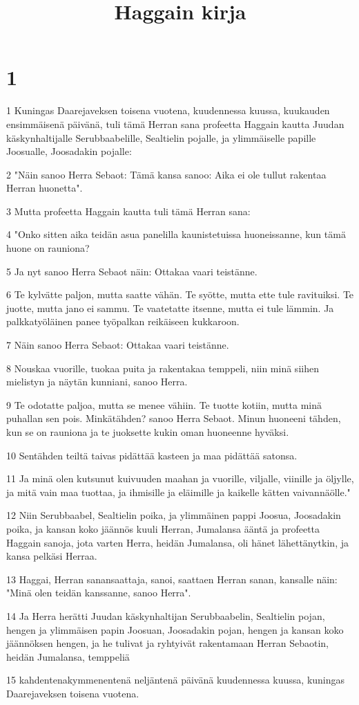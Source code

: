 

\title{Haggain kirja}


\chapter{1}

\par 1 Kuningas Daarejaveksen toisena vuotena, kuudennessa kuussa, kuukauden ensimmäisenä päivänä, tuli tämä Herran sana profeetta Haggain kautta Juudan käskynhaltijalle Serubbaabelille, Sealtielin pojalle, ja ylimmäiselle papille Joosualle, Joosadakin pojalle:
\par 2 "Näin sanoo Herra Sebaot: Tämä kansa sanoo: Aika ei ole tullut rakentaa Herran huonetta".
\par 3 Mutta profeetta Haggain kautta tuli tämä Herran sana:
\par 4 "Onko sitten aika teidän asua panelilla kaunistetuissa huoneissanne, kun tämä huone on rauniona?
\par 5 Ja nyt sanoo Herra Sebaot näin: Ottakaa vaari teistänne.
\par 6 Te kylvätte paljon, mutta saatte vähän. Te syötte, mutta ette tule ravituiksi. Te juotte, mutta jano ei sammu. Te vaatetatte itsenne, mutta ei tule lämmin. Ja palkkatyöläinen panee työpalkan reikäiseen kukkaroon.
\par 7 Näin sanoo Herra Sebaot: Ottakaa vaari teistänne.
\par 8 Nouskaa vuorille, tuokaa puita ja rakentakaa temppeli, niin minä siihen mielistyn ja näytän kunniani, sanoo Herra.
\par 9 Te odotatte paljoa, mutta se menee vähiin. Te tuotte kotiin, mutta minä puhallan sen pois. Minkätähden? sanoo Herra Sebaot. Minun huoneeni tähden, kun se on rauniona ja te juoksette kukin oman huoneenne hyväksi.
\par 10 Sentähden teiltä taivas pidättää kasteen ja maa pidättää satonsa.
\par 11 Ja minä olen kutsunut kuivuuden maahan ja vuorille, viljalle, viinille ja öljylle, ja mitä vain maa tuottaa, ja ihmisille ja eläimille ja kaikelle kätten vaivannäölle."
\par 12 Niin Serubbaabel, Sealtielin poika, ja ylimmäinen pappi Joosua, Joosadakin poika, ja kansan koko jäännös kuuli Herran, Jumalansa ääntä ja profeetta Haggain sanoja, jota varten Herra, heidän Jumalansa, oli hänet lähettänytkin, ja kansa pelkäsi Herraa.
\par 13 Haggai, Herran sanansaattaja, sanoi, saattaen Herran sanan, kansalle näin: "Minä olen teidän kanssanne, sanoo Herra".
\par 14 Ja Herra herätti Juudan käskynhaltijan Serubbaabelin, Sealtielin pojan, hengen ja ylimmäisen papin Joosuan, Joosadakin pojan, hengen ja kansan koko jäännöksen hengen, ja he tulivat ja ryhtyivät rakentamaan Herran Sebaotin, heidän Jumalansa, temppeliä
\par 15 kahdentenakymmenentenä neljäntenä päivänä kuudennessa kuussa, kuningas Daarejaveksen toisena vuotena.

